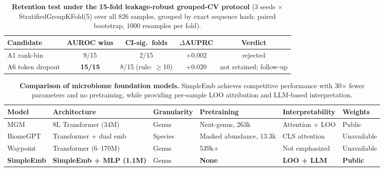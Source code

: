 \documentclass{article} %
\begin{document}
\begin{table}[ht]
\centering
\caption{\textbf{Retention test under the 15-fold leakage-robust grouped-CV protocol} (3 seeds $\times$ StratifiedGroupKFold(5) over all 826 samples, grouped by exact sequence hash; paired bootstrap, 1000 resamples per fold).}
\label{tab:map_retention}
\begin{tabular}{lcccc}
\toprule
Candidate & AUROC wins & CI-sig.\ folds & $\Delta$AUPRC & Verdict \\
\midrule
A1 rank-bin & 9/15 & 2/15 & $+0.002$ & rejected \\
A6 token dropout & \textbf{15/15} & 8/15 (rule: $\geq$10) & $+0.020$ & not retained; follow-up \\
\bottomrule
\end{tabular}
\end{table}

\begin{table}[ht]
\centering
\caption{\textbf{Comparison of microbiome foundation models.}
SimpleEmb achieves competitive performance with 30$\times$ fewer parameters and no pretraining,
while providing per-sample LOO attribution and LLM-based interpretation.}
\label{tab:fm_comparison}
\begin{tabular}{p{2.4cm}p{2.6cm}p{2.0cm}p{2.4cm}p{2.4cm}p{2.2cm}}
\toprule
\textbf{\hspace{0pt}Model} & \textbf{\hspace{0pt}Architecture} & \textbf{\hspace{0pt}Granularity} & \textbf{\hspace{0pt}Pretraining} & \textbf{\hspace{0pt}Interpretability} & \textbf{\hspace{0pt}Weights} \\
\midrule
MGM~\citep{mgm2024} & 8L Transformer (34M) & Genus & Next-genus, 263k & Attention + LOO & Public \\
BiomeGPT~\citep{biomegpt2026} & Transformer + dual emb & Species & Masked abundance, 13.3k & CLS attention & Unavailable \\
Waypoint~\citep{waypoint2026} & Transformer (6--170M) & Genus & 539k+ & Not emphasized & Unavailable \\
\textbf{SimpleEmb} & \textbf{SimpleEmb + MLP (1.1M)} & Genus & \textbf{None} & \textbf{LOO + LLM} & \textbf{Public} \\
\bottomrule
\end{tabular}
\end{table}
\end{document}
